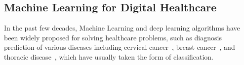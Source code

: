 \documentclass{article}
\newcommand*{\1}{\textcolor{magenta}}
\begin{document}
	\begin{comment}
	\subsection{TSK+ Fuzzy Inference}\label{sparseFRI}
	The Takagi-Sugeno-Kang (TSK) inference system generates a crisp inference result by utilising the weighted average of the sub-consequences based on determined firing strength for all the fired rules~\cite{TSK1985}. Notably, no rule will be fired if a given input does not overlap with any rule antecedent. Thereby, the TSK inference cannot be adopted. TSK+ fuzzy inference~\cite{li2018extended} was proposed to address such an issue which generates a consequence by considering all the rules in the rule base~\cite{Jie2017}. Suppose that a sparse TSK rule base is comprised of  rules:
	
	where  and  represents a normal and convex polygonal fuzzy set that is denoted as (),  is the number of odd points of the fuzzy set. Given an input  in the input domain, a crisp inference result can be generated by the following three steps: \\
	\textbf{Step 1}: Identify the matching degrees  between the given input  and rule antecedents () for each rule  by:
	
	where  is a distance factor defined to measure the distance between the given two fuzzy sets, and is computed as:
	
	where  denotes the sensitivity factor, and  represents the Euclidean distance between the two fuzzy sets.  is a positive-real number s.t. . Smaller value of  yields a similarity degree which is more sensitive to the distance of two fuzzy sets, and vice versa. \\
	\textbf{Step 2}: Determine the firing degree  of each rule by aggregating the matching degrees between a given input and its antecedent terms via:
	
	where  is a t-norm operator and is implemented as a minimum operator. \\
	\textbf{Step 3}: Calculate the final output  by integrating the sub-consequences from all the rules by:
	
	\end{comment}
	
	\subsection{Machine Learning for Digital Healthcare}
	In the past few decades, Machine Learning and deep learning algorithms have been widely proposed for solving healthcare problems, such as diagnosis prediction of various diseases including cervical cancer~\cite{ghoneim2020cervical}, breast cancer~\cite{devarriya2020unbalanced}, and thoracic disease~\cite{li2018thoracic}, which have usually taken the form of classification.
	
\end{document}
